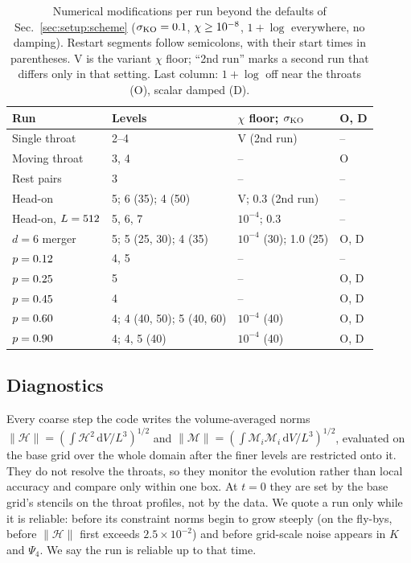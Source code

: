\documentclass[twocolumn,floatfix,aps,prd,superscriptaddress,nofootinbib,showkeys]{revtex4-2}
\begin{document}
\begin{table}[t]
\caption{Numerical modifications per run beyond the defaults of Sec.~\ref{sec:setup:scheme} ($\sigma_{\rm KO}=0.1$, $\chi\ge10^{-8}$, $1{+}\log$ everywhere, no damping). Restart segments follow semicolons, with their start times in parentheses. V is the variant $\chi$ floor; ``2nd run'' marks a second run that differs only in that setting. Last column: $1{+}\log$ off near the throats (O), scalar damped (D).}
\label{tab:mods}
\scriptsize
\setlength{\tabcolsep}{2pt}
\begin{ruledtabular}
\begin{tabular}{llll}
Run & Levels & $\chi$ floor; $\sigma_{\rm KO}$ & O, D \\
\hline
Single throat & 2--4 & V (2nd run) & -- \\
Moving throat & 3, 4 & -- & O \\
Rest pairs & 3 & -- & -- \\
Head-on & 5; 6 (35); 4 (50) & V; 0.3 (2nd run) & -- \\
Head-on, $L=512$ & 5, 6, 7 & $10^{-4}$; 0.3 & -- \\
$d=6$ merger & 5; 5 (25, 30); 4 (35) & $10^{-4}$ (30); 1.0 (25) & O, D \\
$p=0.12$ & 4, 5 & -- & -- \\
$p=0.25$ & 5 & -- & O, D \\
$p=0.45$ & 4 & -- & O, D \\
$p=0.60$ & 4; 4 (40, 50); 5 (40, 60) & $10^{-4}$ (40) & O, D \\
$p=0.90$ & 4; 4, 5 (40) & $10^{-4}$ (40) & O, D \\
\end{tabular}
\end{ruledtabular}
\end{table}

\subsection{Diagnostics}
\label{sec:setup:diagnostics}

Every coarse step the code writes the volume-averaged norms $\|\mathcal H\|=(\int\mathcal H^2\,\mathrm{d}V/L^3)^{1/2}$ and $\|\mathcal M\|=(\int\mathcal M_i\mathcal M_i\,\mathrm{d}V/L^3)^{1/2}$, evaluated on the base grid over the whole domain after the finer levels are restricted onto it. They do not resolve the throats, so they monitor the evolution rather than local accuracy and compare only within one box. At $t=0$ they are set by the base grid's stencils on the throat profiles, not by the data. We quote a run only while it is reliable: before its constraint norms begin to grow steeply (on the fly-bys, before $\|\mathcal H\|$ first exceeds $2.5\times10^{-2}$) and before grid-scale noise appears in $K$ and $\Psi_4$. We say the run is reliable up to that time.
\end{document}
